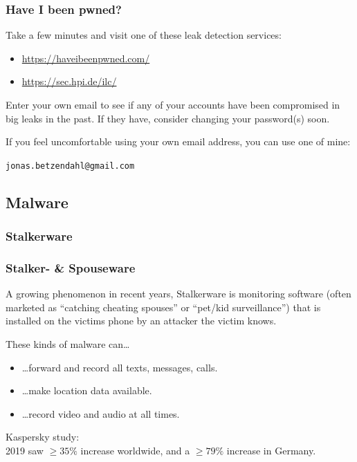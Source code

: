 \documentclass[aspectratio=169,dvipsnames]{beamer}
\begin{document}

\begin{frame}
\frametitle{Have I been pwned?}

Take a few minutes and visit one of these leak detection services:

\begin{itemize}
\item\url{https://haveibeenpwned.com/}
\item\url{https://sec.hpi.de/ilc/}
\end{itemize}
\bigskip

Enter your own email to see if any of your accounts have been compromised in big leaks in the past. If they have, consider changing your password(s) soon.
\bigskip\bigskip

If you feel uncomfortable using your own email address, you can use one of mine:
\begin{center}
\texttt{jonas.betzendahl@gmail.com}
\end{center}

\end{frame}


\subsection{Malware}

\subsubsection{Stalkerware}

\begin{frame}
\frametitle{Stalker- \& Spouseware}

A growing phenomenon in recent years, Stalkerware is monitoring software (often marketed as ``catching cheating spouses'' or ``pet/kid surveillance'') that is installed on the victims phone by an attacker the victim knows.
\bigskip

These kinds of malware can\dots

\begin{itemize}
\item\dots forward and record all texts, messages, calls.
\item\dots make location data available.
\item\dots record video and audio at all times.
\end{itemize}
\pause\bigskip

Kaspersky study:\\ 2019 saw $\geq 35\%$ increase worldwide, and a $\geq 79\%$ increase in Germany.
\end{frame}
\end{document}
